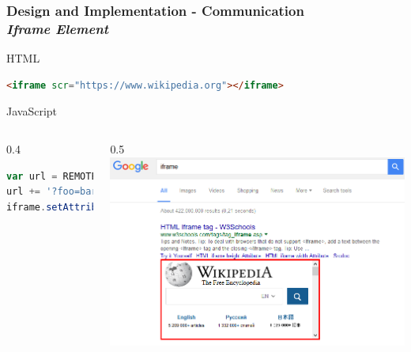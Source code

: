 \documentclass[accentcolor=tud9c,colorbacktitle,xcolor=dvipsnames]{tudbeamer}
\begin{document}
\begin{frame}[fragile]
    \frametitle{Design and Implementation - Communication \\ \textit{Iframe Element}}
        \begin{block}{HTML}
            \begin{lstlisting}[language=HTML, numbers=none]
<iframe scr="https://www.wikipedia.org"></iframe>
\end{lstlisting}
    \end{block}
    \begin{block}{JavaScript}
        \begin{columns}[T]
            \begin{column}[T]{0.4\textwidth} 
                \begin{block}{}
                    \begin{lstlisting}[language=JavaScript]
var url = REMOTE_URL;
url += '?foo=bar';
iframe.setAttribute('src', url);
\end{lstlisting}
                \end{block}
            \end{column}
            \begin{column}[T]{0.5\textwidth}
                 \includegraphics[scale=0.3]{./graphics/iframe.png}
            \end{column}
        \end{columns}
    \end{block}
\end{frame}
\end{document}
